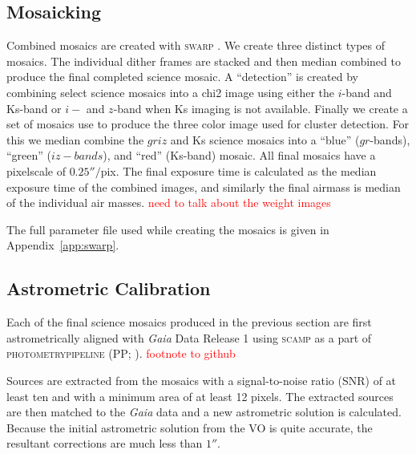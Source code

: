 \documentclass[apj, revtex4]{emulateapj}
\newcommand{\editorial}[1]{\textcolor{red}{#1}}
\begin{document}
\subsection{Mosaicking}\label{sec:mosaicks}
Combined mosaics are created with \textsc{swarp} \citep{Bertin2002}. We create three distinct types of mosaics. The individual dither frames are stacked and then median combined to produce the final completed science mosaic. A ``detection'' is created by combining select science mosaics into a chi2 image using either the $i$-band and Ks-band or $i-$ and $z$-band when Ks imaging is not available. Finally we create a set of mosaics use to produce the three color image used for cluster detection. For this we median combine the $griz$ and Ks science mosaics into a ``blue'' ($gr$-bands), ``green'' ($iz-bands$), and ``red'' (Ks-band) mosaic. All final mosaics have a pixelscale of $0.25''/$pix. The final exposure time is calculated as the median exposure time of the combined images, and similarly the final airmass is median of the individual air masses. \editorial{need to talk about the weight images}

The full parameter file used while creating the mosaics is given in Appendix~\ref{app:swarp}.

\subsection{Astrometric Calibration}
Each of the final science mosaics produced in the previous section are first astrometrically aligned with \textit{Gaia} \citep{GaiaCollaboration2016} Data Release 1 \citep{GaiaCollaboration2016a} using \textsc{scamp} \citep{Bertin2006} as a part of \textsc{photometrypipeline} (PP; \citealt{Mommert2017}). \editorial{footnote to github}

Sources are extracted from the mosaics with a signal-to-noise ratio (SNR) of at least ten and with a minimum area of at least 12 pixels. The extracted sources are then matched to the \textit{Gaia} data and a new astrometric solution is calculated. Because the initial astrometric solution from the VO is quite accurate, the resultant corrections are much less than $1''$.
\end{document}
